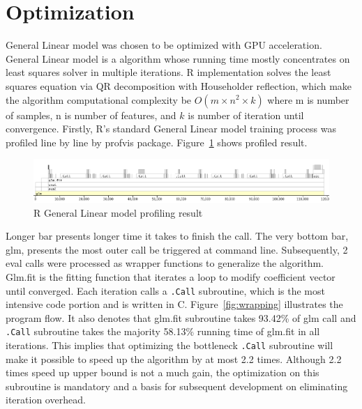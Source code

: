 \documentclass[English]{dicomopapers}
\begin{document}
\section{Optimization}
General Linear model was chosen to be optimized with GPU acceleration. General Linear model is a algorithm whose running time mostly concentrates on least squares solver in multiple iterations. R implementation solves the least squares equation via QR decomposition with Householder reflection, which make the algorithm computational complexity be \(O(m \times n ^ 2 \times k)\) where m is number of samples, n is number of features, and \(k\) is number of iteration until convergence.\newline
Firstly, R's standard General Linear model training process was profiled line by line by profvis package. Figure~\ref{fig:profvis} shows profiled result.\newline
\begin{figure}[ht]
  \vspace*{-0.8cm}
  \centering
  \includegraphics[width=\columnwidth,natwidth=1021,natheight=151]{profvis.png}
  \caption{R General Linear model profiling result}\label{fig:profvis}
\end{figure}
\newline
Longer bar presents longer time it takes to finish the call. The very bottom bar, glm, presents the most outer call be triggered at command line. Subsequently, 2 eval calls were processed as wrapper functions to generalize the algorithm. Glm.fit is the fitting function that iterates a loop to modify coefficient vector until converged. Each iteration calls a \texttt{.Call} subroutine, which is the most intensive code portion and is written in C. Figure~\ref{fig:wrapping} illustrates the program flow. It also denotes that glm.fit subroutine takes 93.42\% of glm call and \texttt{.Call} subroutine takes the majority 58.13\% running time of glm.fit in all iterations. This implies that optimizing the bottleneck \texttt{.Call} subroutine will make it possible to speed up the algorithm by at most 2.2 times. Although 2.2 times speed up upper bound is not a much gain, the optimization on this subroutine is mandatory and a basis for subsequent development on eliminating iteration overhead.\newline
\end{document}
